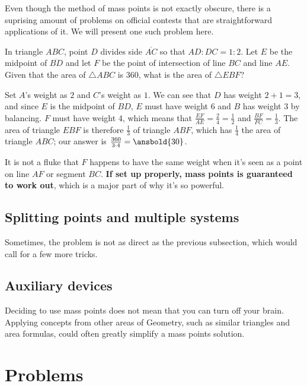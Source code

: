\documentclass{article}
\begin{document}
Even though the method of mass points is not exactly obscure, there is a suprising amount of problems on official contests that are straightforward applications of it. We will present one such problem here.
\begin{exam}[2019 AMC 8/24]
In triangle $ABC$, point $D$ divides side $\overline{AC}$ so that $AD:DC=1:2$. Let $E$ be the midpoint of $\overline{BD}$ and let $F$ be the point of intersection of line $BC$ and line $AE$. Given that the area of $\triangle ABC$ is $360$, what is the area of $\triangle EBF$?
\end{exam}
\begin{sol}
Set $A$'s weight as $2$ and $C$'s weight as $1$. We can see that $D$ has weight $2+1=3$, and since $E$ is the midpoint of $BD$, $E$ must have weight $6$ and $B$ has weight $3$ by balancing. $F$ must have weight $4$, which means that $\frac{EF}{AE}=\frac{2}{4}=\frac{1}{2}$ and $\frac{BF}{FC}=\frac{1}{3}$. The area of triangle $EBF$ is therefore $\frac{1}{3}$ of triangle $ABF$, which has $\frac{1}{4}$ the area of triangle $ABC$; our answer is $\frac{360}{3\cdot 4}=\ansbold{30}$.
\end{sol}

It is not a fluke that $F$ happens to have the same weight when it's seen as a point on line $AF$ or segment $BC$. \textbf{If set up properly, mass points is guaranteed to work out}, which is a major part of why it's so powerful. 
\subsection{Splitting points and multiple systems}
Sometimes, the problem is not as direct as the previous subsection, which would call for a few more tricks.
\subsection{Auxiliary devices}
Deciding to use mass points does not mean that you can turn off your brain. Applying concepts from other areas of Geometry, such as similar triangles and area formulas, could often greatly simplify a mass points solution.
\section{Problems}
\end{document}
